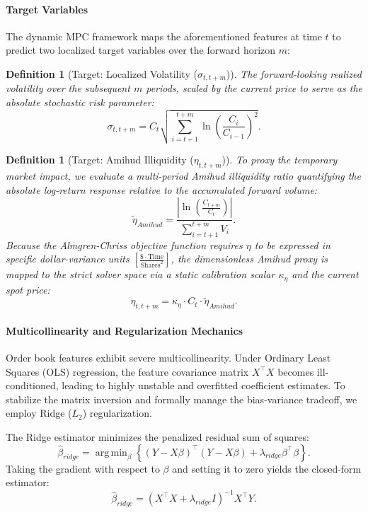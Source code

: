 \documentclass[11pt,a4paper]{article}
\newtheorem{definition}[theorem]{Definition}
\DeclareMathOperator*{\argmin}{arg\,min}
\begin{document}
\paragraph{Target Variables}
The dynamic MPC framework maps the aforementioned features at time $t$ to predict two localized target variables over the forward horizon $m$:

\begin{definition}[Target: Localized Volatility ($\sigma_{t, t+m}$)]
The forward-looking realized volatility over the subsequent $m$ periods, scaled by the current price to serve as the absolute stochastic risk parameter:
\[ \sigma_{t, t+m} = C_t \sqrt{ \sum_{i=t+1}^{t+m} \ln\left(\frac{C_i}{C_{i-1}}\right)^2 }. \]
\end{definition}

\begin{definition}[Target: Amihud Illiquidity ($\eta_{t, t+m}$)]
To proxy the temporary market impact, we evaluate a multi-period Amihud illiquidity ratio quantifying the absolute log-return response relative to the accumulated forward volume:
\[ \tilde{\eta}_{Amihud} = \frac{\left| \ln\left(\frac{C_{t+m}}{C_t}\right) \right|}{\sum_{i=t+1}^{t+m} V_i}. \]
Because the Almgren-Chriss objective function requires $\eta$ to be expressed in specific dollar-variance units $\left[ \frac{\$ \cdot \text{Time}}{\text{Shares}^2} \right]$, the dimensionless Amihud proxy is mapped to the strict solver space via a static calibration scalar $\kappa_\eta$ and the current spot price:
\[ \eta_{t, t+m} = \kappa_\eta \cdot C_t \cdot \tilde{\eta}_{Amihud}. \]
\end{definition}

\paragraph{Multicollinearity and Regularization Mechanics}
Order book features exhibit severe multicollinearity. Under Ordinary Least Squares (OLS) regression, the feature covariance matrix $X^\top X$ becomes ill-conditioned, leading to highly unstable and overfitted coefficient estimates. To stabilize the matrix inversion and formally manage the bias-variance tradeoff, we employ Ridge ($L_2$) regularization.

The Ridge estimator minimizes the penalized residual sum of squares:
\[ \hat{\beta}_{ridge} = \argmin_{\beta} \left\{ (Y - X\beta)^\top(Y - X\beta) + \lambda_{ridge} \beta^\top \beta \right\}. \]
Taking the gradient with respect to $\beta$ and setting it to zero yields the closed-form estimator:
\begin{equation}
\hat{\beta}_{ridge} = (X^\top X + \lambda_{ridge} I)^{-1} X^\top Y.
\end{equation}
\end{document}
